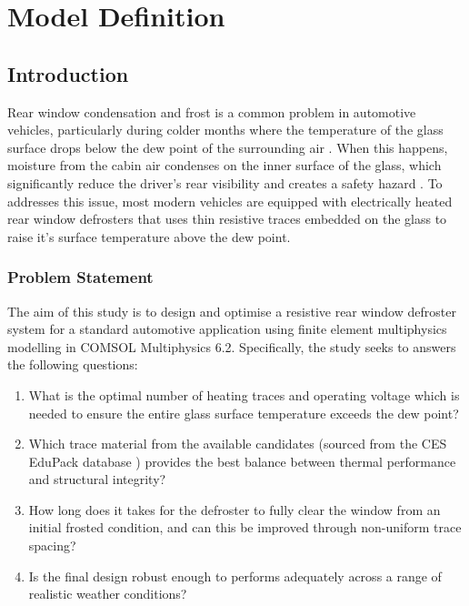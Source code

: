 \chapter{Model Definition}
\label{ch:model-definition}

\section{Introduction}
\label{sec:introduction}
Rear window condensation and frost is a common problem in automotive vehicles, particularly during colder months where the temperature of the glass surface drops below the dew point of the surrounding air \cite{lawrence2005}. When this happens, moisture from the cabin air condenses on the inner surface of the glass, which significantly reduce the driver's rear visibility and creates a safety hazard \cite{sayer1999}. To addresses this issue, most modern vehicles are equipped with electrically heated rear window defrosters that uses thin resistive traces embedded on the glass to raise it's surface temperature above the dew point.

\subsection{Problem Statement}

The aim of this study is to design and optimise a resistive rear window defroster system for a standard automotive application using finite element multiphysics modelling in COMSOL Multiphysics 6.2. Specifically, the study seeks to answers the following questions:

\begin{enumerate}
    \item What is the optimal number of heating traces and operating voltage which is needed to ensure the entire glass surface temperature exceeds the dew point?
    \item Which trace material from the available candidates (sourced from the CES EduPack database \cite{edupack}) provides the best balance between thermal performance and structural integrity?
    \item How long does it takes for the defroster to fully clear the window from an initial frosted condition, and can this be improved through non-uniform trace spacing?
    \item Is the final design robust enough to performs adequately across a range of realistic weather conditions?
\end{enumerate}

